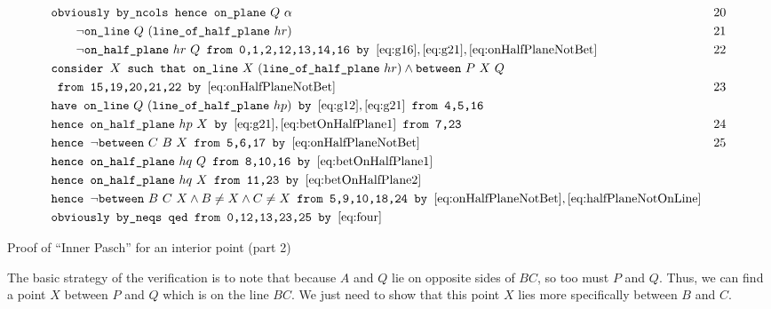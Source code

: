 \begin{boxedfigure}[h]
\small
\begin{align*}
&\texttt{obviously by\_ncols hence } \code{on\_plane}\ Q\ \alpha& 20\\
&\qquad\neg\code{on\_line}\ Q\ (\code{line\_of\_half\_plane}\ hr) & 21\\
&\qquad\neg\code{on\_half\_plane}\ hr\ Q \texttt{ from 0,1,2,12,13,14,16 by } \eqref{eq:g16}, \eqref{eq:g21}, \eqref{eq:onHalfPlaneNotBet}& 22\\
&\texttt{consider } X \texttt{ such that } \code{on\_line}\ X\ (\code{line\_of\_half\_plane}\ hr) \wedge \between{P}{X}{Q}\\
&\texttt{ from 15,19,20,21,22 by } \eqref{eq:onHalfPlaneNotBet} & 23 \\
&\texttt{have } \code{on\_line}\ Q\ (\code{line\_of\_half\_plane}\ hp)\texttt{ by } \eqref{eq:g12}, \eqref{eq:g21} \texttt{ from 4,5,16}\\
&\texttt{hence } \code{on\_half\_plane}\ hp\ X\texttt{ by } \eqref{eq:g21}, \eqref{eq:betOnHalfPlane1} \texttt{ from 7,23} & 24\\
&\texttt{hence } \neg\between{C}{B}{X} \texttt{ from 5,6,17 by } \eqref{eq:onHalfPlaneNotBet} & 25\\
&\texttt{hence } \code{on\_half\_plane}\ hq\ Q \texttt{ from 8,10,16 by } \eqref{eq:betOnHalfPlane1}\\
&\texttt{hence } \code{on\_half\_plane}\ hq\ X \texttt{ from 11,23 by } \eqref{eq:betOnHalfPlane2}\\
&\texttt{hence } \neg\between{B}{C}{X} \wedge B \neq X \wedge C \neq X\texttt{ from 5,9,10,18,24 by } \eqref{eq:onHalfPlaneNotBet}, \eqref{eq:halfPlaneNotOnLine}\\
&\texttt{obviously by\_neqs qed from 0,12,13,23,25 by } \eqref{eq:four}
\end{align*}
\caption{Proof of ``Inner Pasch'' for an interior point (part 2)}
\label{fig:tricut12}
\end{boxedfigure}


The basic strategy of the verification is to note that because $A$ and $Q$ lie on opposite sides of $BC$, so too must $P$ and $Q$. Thus, we can find a point $X$ between $P$ and $Q$ which is on the line $BC$. We just need to show that this point $X$ lies more specifically between $B$ and $C$.

